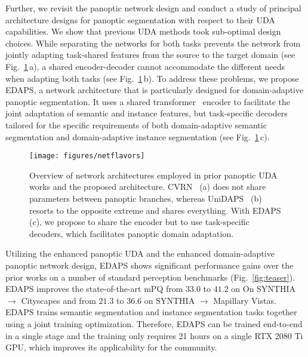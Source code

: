 \documentclass[10pt,twocolumn,letterpaper]{article}
\begin{document}
Further, we revisit the panoptic network design and conduct a study of principal architecture designs for panoptic segmentation with respect to their UDA capabilities. We show that previous UDA methods took sub-optimal design choices. While separating the networks for both tasks prevents the network from jointly adapting task-shared features from the source to the target domain (see Fig.~\ref{fig:architecture_comparison}\,a), a shared encoder-decoder cannot accommodate the different needs when adapting both tasks (see Fig.~\ref{fig:architecture_comparison}\,b). 
To address these problems, we propose EDAPS, a network architecture that is particularly designed for domain-adaptive panoptic segmentation. It uses a shared transformer~\cite{vaswani2017attention} encoder to facilitate the joint adaptation of semantic and instance features, but task-specific decoders tailored for the specific requirements of 
both domain-adaptive semantic segmentation and domain-adaptive instance segmentation (see Fig.~\ref{fig:architecture_comparison}\,c).


\begin{figure}[t]
  \centering
  \texttt{[image: figures/netflavors]}
  \caption{
    Overview of network architectures employed in prior panoptic UDA works and the proposed architecture. CVRN~\cite{huang2021cross} 
    (a) does not share parameters between panoptic branches, whereas UniDAPS~\cite{zhang2022hierarchical} 
    (b) resorts to the opposite extreme and shares everything. 
    With EDAPS (c), we propose to share the encoder but to use task-specific decoders, which facilitates panoptic domain adaptation.
  }
  \label{fig:architecture_comparison}
\end{figure}

Utilizing the enhanced panoptic UDA and the enhanced domain-adaptive panoptic network design, EDAPS shows significant performance gains over the prior works on a number of standard perception benchmarks (Fig.~\ref{fig:teaser}).
EDAPS improves the state-of-the-art mPQ from $33.0$ to $41.2$ on On SYNTHIA $\rightarrow$ Cityscapes and from $21.3$ to $36.6$ on SYNTHIA $\rightarrow$ Mapillary Vistas. 
EDAPS trains semantic segmentation and instance segmentation tasks together using a joint training optimization. Therefore, EDAPS can be trained end-to-end in a single stage and the training only requires 21 hours on a single RTX 2080 Ti GPU, which improves its applicability for the community.
\end{document}
